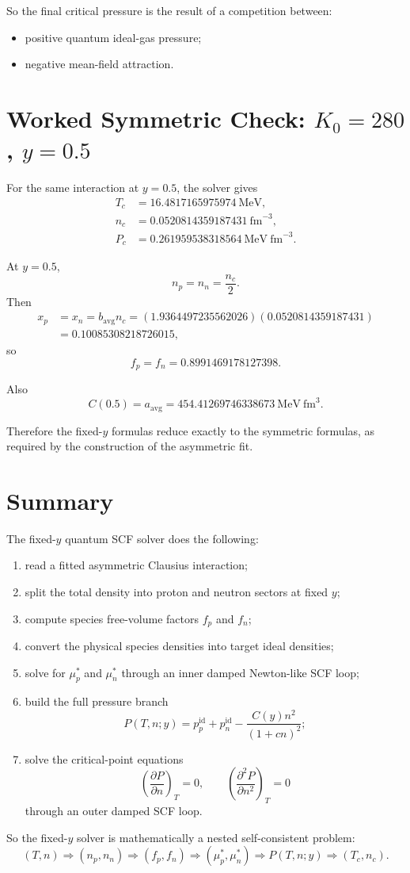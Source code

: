\documentclass[11pt]{article}
\begin{document}
So the final critical pressure is the result of a competition between:
\begin{itemize}
\item positive quantum ideal-gas pressure;
\item negative mean-field attraction.
\end{itemize}

\section{Worked Symmetric Check: \texorpdfstring{$K_0=280$}{K0=280}, \texorpdfstring{$y=0.5$}{y=0.5}}

For the same interaction at $y=0.5$, the solver gives
\begin{align}
T_c &= 16.4817165975974\ \mathrm{MeV}, \\
n_c &= 0.0520814359187431\ \mathrm{fm}^{-3}, \\
P_c &= 0.261959538318564\ \mathrm{MeV\ fm}^{-3}.
\end{align}

At $y=0.5$,
\[
n_p=n_n=\frac{n_c}{2}.
\]
Then
\begin{align}
x_p &= x_n = b_{\mathrm{avg}}n_c
=
(1.9364497235562026)(0.0520814359187431) \\
&=
0.10085308218726015,
\end{align}
so
\[
f_p=f_n=0.8991469178127398.
\]

Also
\[
C(0.5)=a_{\mathrm{avg}}=454.41269746338673\ \mathrm{MeV\ fm}^3.
\]

Therefore the fixed-$y$ formulas reduce exactly to the symmetric formulas, as
required by the construction of the asymmetric fit.

\section{Summary}

The fixed-$y$ quantum SCF solver does the following:
\begin{enumerate}
\item read a fitted asymmetric Clausius interaction;
\item split the total density into proton and neutron sectors at fixed $y$;
\item compute species free-volume factors $f_p$ and $f_n$;
\item convert the physical species densities into target ideal densities;
\item solve for $\mu_p^\ast$ and $\mu_n^\ast$ through an inner damped
Newton-like SCF loop;
\item build the full pressure branch
\[
P(T,n;y)=p_p^{\mathrm{id}}+p_n^{\mathrm{id}}-\frac{C(y)n^2}{(1+cn)^2};
\]
\item solve the critical-point equations
\[
\left(\frac{\partial P}{\partial n}\right)_T=0,
\qquad
\left(\frac{\partial^2 P}{\partial n^2}\right)_T=0
\]
through an outer damped SCF loop.
\end{enumerate}

So the fixed-$y$ solver is mathematically a nested self-consistent problem:
\[
(T,n)
\Longrightarrow
(n_p,n_n)
\Longrightarrow
(f_p,f_n)
\Longrightarrow
(\mu_p^\ast,\mu_n^\ast)
\Longrightarrow
P(T,n;y)
\Longrightarrow
(T_c,n_c).
\]
\end{document}

